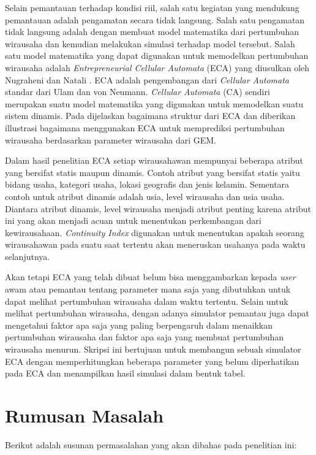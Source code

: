Selain pemantauan terhadap kondisi riil, salah satu kegiatan yang mendukung pemantauan adalah pengamatan secara tidak langsung. Salah satu pengamatan tidak langsung adalah dengan membuat model matematika dari pertumbuhan wirausaha dan kemudian melakukan simulasi terhadap model tersebut. Salah satu model matematika yang dapat digunakan untuk memodelkan pertumbuhan wirausaha adalah \textit{Entrepreneurial Cellular Automata} (ECA) yang diusulkan oleh Nugraheni dan Natali \cite{ECA}. ECA adalah pengembangan dari \textit{Cellular Automata} standar dari Ulam dan von Neumann. \textit{Cellular Automata} (CA) sendiri merupakan suatu model matematika yang digunakan untuk memodelkan suatu sistem dinamis. Pada \cite{ECA} dijelaskan bagaimana struktur dari ECA dan diberikan illustrasi bagaimana menggunakan ECA untuk memprediksi pertumbuhan wirausaha berdasarkan parameter wirausaha dari GEM. 


Dalam hasil penelitian ECA setiap wirausahawan mempunyai beberapa atribut yang bersifat statis maupun dinamis. Contoh atribut yang bersifat statis yaitu bidang usaha, kategori usaha, lokasi geografis dan jenis kelamin. Sementara contoh untuk atribut dinamis adalah usia, level wirausaha dan usia usaha. Diantara atribut dinamis, level wirausaha menjadi atribut penting karena atribut ini yang akan menjadi acuan untuk menentukan perkembangan dari kewirausahaan. \textit{Continuity Index} digunakan untuk menentukan apakah seorang wirausahawan pada suatu saat tertentu akan meneruskan usahanya pada waktu selanjutnya.


Akan tetapi ECA yang telah dibuat belum bisa menggambarkan kepada \textit{user} awam atau pemantau tentang parameter mana saja yang dibutuhkan untuk dapat melihat pertumbuhan wirausaha dalam waktu tertentu. Selain untuk melihat pertumbuhan wirausaha, dengan adanya simulator pemantau juga dapat mengetahui faktor apa saja yang paling berpengaruh dalam menaikkan pertumbuhan wirausaha dan faktor apa saja yang membuat pertumbuhan wirausaha menurun.
Skripsi ini bertujuan untuk membangun sebuah simulator ECA dengan memperhitungkan beberapa parameter yang belum diperhatikan pada ECA dan menampilkan hasil simulasi dalam bentuk tabel.



\section{Rumusan Masalah}
\label{sec:rumusan}
Berikut adalah susunan permasalahan yang akan dibahas pada penelitian ini:



